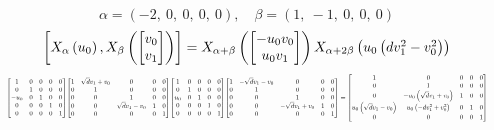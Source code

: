 \documentclass[11pt]{article}
\theoremstyle{definition}
\begin{document}
\providecommand{\scaletoalign}[2]{%
  \sbox0{$#2$}%
  \ifdim\wd0>#1\relax 
    \resizebox{#1}{!}{\usebox0}%
  \else 
    \usebox0%
  \fi 
}
\[
\alpha = \left( -2, \  0, \  0, \  0, \  0\right), \quad \beta = \left( 1, \  -1, \  0, \  0, \  0\right)
\]
\[
\scaletoalign{\textwidth}{\left[ X_{\alpha}\left(u_{0}\right), X_{\beta}\left(\left[\begin{matrix}v_{0}\\v_{1}\end{matrix}\right]\right) \right] = X_{\alpha + \beta}\left(\left[\begin{matrix}- u_{0} v_{0}\\u_{0} v_{1}\end{matrix}\right]\right) X_{\alpha + 2\beta}\left(u_{0} \left(d v_{1}^{2} - v_{0}^{2}\right)\right)}
\]
\[
\scaletoalign{\textwidth}{{\left[\begin{matrix}1 & 0 & 0 & 0 & 0\\0 & 1 & 0 & 0 & 0\\- u_{0} & 0 & 1 & 0 & 0\\0 & 0 & 0 & 1 & 0\\0 & 0 & 0 & 0 & 1\end{matrix}\right]} {\left[\begin{matrix}1 & \sqrt{d} v_{1} + v_{0} & 0 & 0 & 0\\0 & 1 & 0 & 0 & 0\\0 & 0 & 1 & 0 & 0\\0 & 0 & \sqrt{d} v_{1} - v_{0} & 1 & 0\\0 & 0 & 0 & 0 & 1\end{matrix}\right]} {\left[\begin{matrix}1 & 0 & 0 & 0 & 0\\0 & 1 & 0 & 0 & 0\\u_{0} & 0 & 1 & 0 & 0\\0 & 0 & 0 & 1 & 0\\0 & 0 & 0 & 0 & 1\end{matrix}\right]} {\left[\begin{matrix}1 & - \sqrt{d} v_{1} - v_{0} & 0 & 0 & 0\\0 & 1 & 0 & 0 & 0\\0 & 0 & 1 & 0 & 0\\0 & 0 & - \sqrt{d} v_{1} + v_{0} & 1 & 0\\0 & 0 & 0 & 0 & 1\end{matrix}\right]} = {\left[\begin{matrix}1 & 0 & 0 & 0 & 0\\0 & 1 & 0 & 0 & 0\\0 & - u_{0} \left(\sqrt{d} v_{1} + v_{0}\right) & 1 & 0 & 0\\u_{0} \left(\sqrt{d} v_{1} - v_{0}\right) & u_{0} \left(- d v_{1}^{2} + v_{0}^{2}\right) & 0 & 1 & 0\\0 & 0 & 0 & 0 & 1\end{matrix}\right]}}
\]
\end{document}
